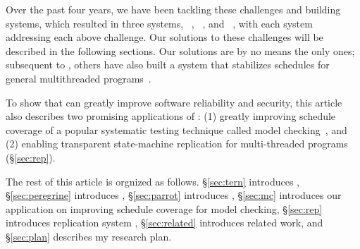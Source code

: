 Over the past four years, we have been tackling these challenges and
building \smt systems, which resulted in three \smt systems,
\tern~\cite{cui:tern:osdi10}, \peregrine~\cite{peregrine:sosp11}, and
 \parrot~\cite{parrot:sosp13}, with each system addressing each above challenge.
 Our solutions to these challenges will be described in the following sections.
 Our solutions are by no means the only
 ones; subsequent to \tern, others have also built a system that
 stabilizes schedules for general multithreaded programs~\cite{dthreads:sosp11}.

 To show that \smt can greatly improve software 
 reliability and security, this article also describes two promising applications of \smt: 
 (1) greatly improving schedule coverage of a popular systematic testing technique 
 called model checking~\cite{parrot:sosp13}, and  (2) enabling transparent state-machine replication
 for multi-threaded programs (\S\ref{sec:rep}).

The rest of this article is orgnized as follows. \S\ref{sec:tern} introduces \tern, 
\S\ref{sec:peregrine} introduces 
\peregrine, \S\ref{sec:parrot} introduces \parrot, \S\ref{sec:mc} introduces our 
application on improving schedule coverage for model checking,
\S\ref{sec:rep} introduces replication system \msmr, \S\ref{sec:related} introduces 
related work, and \S\ref{sec:plan} describes my research plan.

